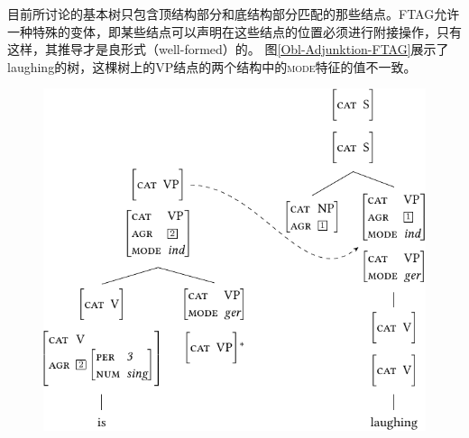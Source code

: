 目前所讨论的基本树只包含顶结构部分和底结构部分匹配的那些结点。FTAG允许一种特殊的变体，即某些结点可以声明在这些结点的位置必须进行附接操作，只有这样，其推导才是良形式（well-formed）的。
图\vref{Obl-Adjunktion-FTAG}展示了laughing的树，这棵树上的VP结点的两个结构中的\textsc{mode}特征的值不一致。
\begin{figure}
\centerline{%
\includegraphics{Figures/tag-obl-adj-ftag-cropped}
}

\end{figure}
